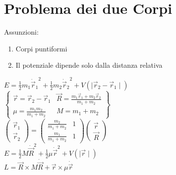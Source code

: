 \documentclass[a4paper,NoNotes,GeneralMath,12pt]{stdmdoc}
\begin{document}
	\section*{Problema dei due Corpi}
	Assunzioni: 
	\begin{enumerate}
		\item Corpi puntiformi
		\item Il potenziale dipende solo dalla distanza relativa
	\end{enumerate}
	$E = \frac{1}{2} m_1 {\dot{\vec{r}}_1}^2 + \frac{1}{2} m_2 {\dot{\vec{r}}_2}^2 + V \left( \mid \vec{r}_2 - \vec{r}_1 \mid \right)$ \\ $\left\{ \begin{array}{cc} \vec{r} = \vec{r}_2 - \vec{r}_1 & \vec{R} = \frac{m_1 \vec{r}_1 + m_2 \vec{r}_2}{m_1 + m_2} \\ \mu = \frac{m_1 m_2}{m_1 + m_2} & M = m_1 + m_2 \end{array} \right\}$ \\ $\left( \begin{array}{c} \vec{r}_1 \\ \vec{r}_2 \end{array} \right) = \left( \begin{array}{cc} \frac{m_2}{m_1 + m_2} & 1 \\ \frac{m_1}{m_1 + m_2} & 1 \end{array} \right) \left( \begin{array}{c} \vec{r} \\ \vec{R} \end{array} \right)$ \\
	$E = \frac{1}{2} M {\dot{\vec{R}}}^2 + \frac{1}{2} \mu {\dot{\vec{r}}}^2 + V \left( \mid \vec{r} \mid \right)$ \\ $L = \vec{R} \times M \dot{\vec{R}} + \vec{r} \times \mu \dot{\vec{r}}$
\end{document}
